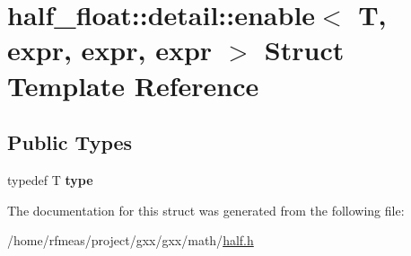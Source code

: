 \hypertarget{structhalf__float_1_1detail_1_1enable_3_01T_00_01expr_00_01expr_00_01expr_01_4}{}\section{half\+\_\+float\+:\+:detail\+:\+:enable$<$ T, expr, expr, expr $>$ Struct Template Reference}
\label{structhalf__float_1_1detail_1_1enable_3_01T_00_01expr_00_01expr_00_01expr_01_4}
\subsection*{Public Types}
\begin{DoxyCompactItemize}
\item 
typedef T {\bfseries type}\hypertarget{structhalf__float_1_1detail_1_1enable_3_01T_00_01expr_00_01expr_00_01expr_01_4_a1dee5125aa0c5cfbd25e725ed2530905}{}\label{structhalf__float_1_1detail_1_1enable_3_01T_00_01expr_00_01expr_00_01expr_01_4_a1dee5125aa0c5cfbd25e725ed2530905}

\end{DoxyCompactItemize}


The documentation for this struct was generated from the following file\+:\begin{DoxyCompactItemize}
\item 
/home/rfmeas/project/gxx/gxx/math/\hyperlink{half_8h}{half.\+h}\end{DoxyCompactItemize}
